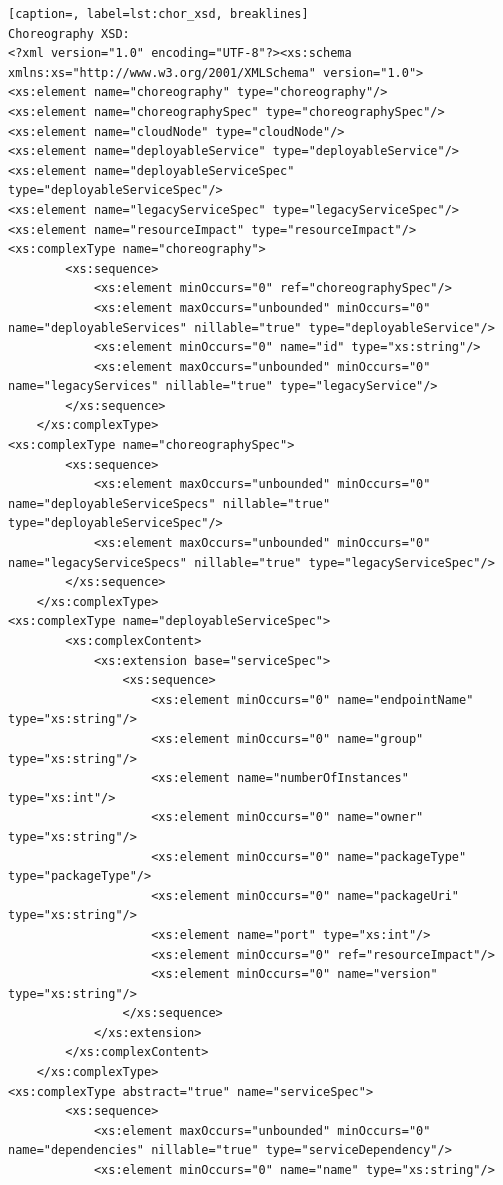 {\begin{lstlisting}[caption=, label=lst:chor_xsd, breaklines]
Choreography XSD:
<?xml version="1.0" encoding="UTF-8"?><xs:schema xmlns:xs="http://www.w3.org/2001/XMLSchema" version="1.0">
<xs:element name="choreography" type="choreography"/>
<xs:element name="choreographySpec" type="choreographySpec"/>
<xs:element name="cloudNode" type="cloudNode"/>
<xs:element name="deployableService" type="deployableService"/>
<xs:element name="deployableServiceSpec" type="deployableServiceSpec"/>
<xs:element name="legacyServiceSpec" type="legacyServiceSpec"/>
<xs:element name="resourceImpact" type="resourceImpact"/>
<xs:complexType name="choreography">
        <xs:sequence>
            <xs:element minOccurs="0" ref="choreographySpec"/>
            <xs:element maxOccurs="unbounded" minOccurs="0" name="deployableServices" nillable="true" type="deployableService"/>
            <xs:element minOccurs="0" name="id" type="xs:string"/>
            <xs:element maxOccurs="unbounded" minOccurs="0" name="legacyServices" nillable="true" type="legacyService"/>
        </xs:sequence>
    </xs:complexType>
<xs:complexType name="choreographySpec">
        <xs:sequence>
            <xs:element maxOccurs="unbounded" minOccurs="0" name="deployableServiceSpecs" nillable="true" type="deployableServiceSpec"/>
            <xs:element maxOccurs="unbounded" minOccurs="0" name="legacyServiceSpecs" nillable="true" type="legacyServiceSpec"/>
        </xs:sequence>
    </xs:complexType>
<xs:complexType name="deployableServiceSpec">
        <xs:complexContent>
            <xs:extension base="serviceSpec">
                <xs:sequence>
                    <xs:element minOccurs="0" name="endpointName" type="xs:string"/>
                    <xs:element minOccurs="0" name="group" type="xs:string"/>
                    <xs:element name="numberOfInstances" type="xs:int"/>
                    <xs:element minOccurs="0" name="owner" type="xs:string"/>
                    <xs:element minOccurs="0" name="packageType" type="packageType"/>
                    <xs:element minOccurs="0" name="packageUri" type="xs:string"/>
                    <xs:element name="port" type="xs:int"/>
                    <xs:element minOccurs="0" ref="resourceImpact"/>
                    <xs:element minOccurs="0" name="version" type="xs:string"/>
                </xs:sequence>
            </xs:extension>
        </xs:complexContent>
    </xs:complexType>
<xs:complexType abstract="true" name="serviceSpec">
        <xs:sequence>
            <xs:element maxOccurs="unbounded" minOccurs="0" name="dependencies" nillable="true" type="serviceDependency"/>
            <xs:element minOccurs="0" name="name" type="xs:string"/>

\end{lstlisting}}
